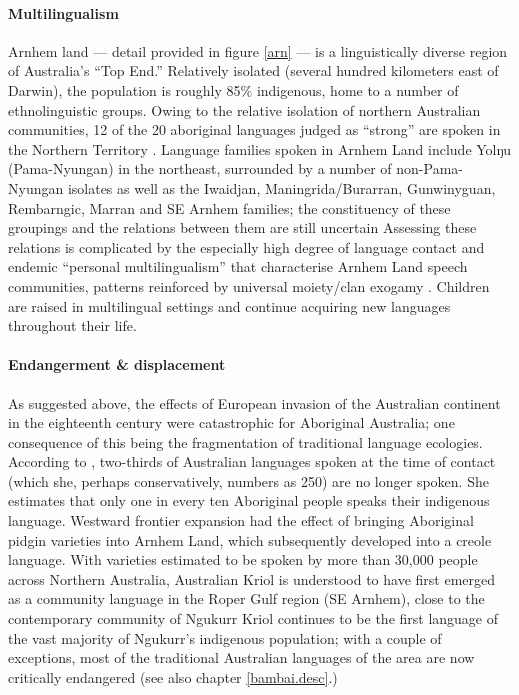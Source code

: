 \documentclass[11pt,dvipsnames]{report}
\begin{document}
\paragraph*{Multilingualism}

Arnhem land --- detail provided in figure \ref{arn} --- is a linguistically diverse region of Australia's ``Top End.'' Relatively isolated (several hundred kilometers east of Darwin), the population is roughly 85\% indigenous, home to a number of ethnolinguistic groups. Owing to the relative isolation of northern Australian communities, 12 of the 20 aboriginal languages judged as ``strong'' are spoken in the Northern Territory \citep[3]{Schmidt1990}. Language families spoken in Arnhem Land include Yolŋu (Pama-Nyungan) in the northeast, surrounded by a number of non-Pama-Nyungan isolates as well as the Iwaidjan, Maningrida/Burarran, Gunwinyguan, Rembarngic, Marran and SE Arnhem families; the constituency of these groupings and the relations between them are still uncertain \citetext{see \textit{e.g.}, \citealp{Green2003} for the proto-Arnhem proposal.} Assessing these relations is complicated by the especially high degree of language contact and endemic ``personal multilingualism'' that characterise Arnhem Land speech communities, patterns reinforced by universal moiety/clan exogamy \citetext{\citealp{McConvell2011,Evans2001}, see also \citealp[Ch. 1]{Williams1986,Wilkinson1991} for a discussion of clan exogamy in Yolŋu society}. Children are raised in multilingual settings and continue acquiring new languages throughout their life. 

\paragraph*{Endangerment \& displacement}

As suggested above, the effects of European invasion of the Australian continent in the eighteenth century were catastrophic for Aboriginal Australia; one consequence of this being the fragmentation of traditional language ecologies. According to \citet[1]{Schmidt1990}, two-thirds of Australian languages spoken at the time of contact (which she, perhaps conservatively, numbers as 250) are no longer spoken. She estimates that only one in every ten Aboriginal people speaks their indigenous language. Westward frontier expansion had the effect of bringing Aboriginal pidgin varieties into Arnhem Land, which subsequently developed into a creole language. With varieties estimated to be spoken by more than 30,000 people across Northern Australia, Australian Kriol is understood to have first emerged as a community language in the Roper Gulf region (SE Arnhem), close to the contemporary community of Ngukurr \citetext{\textit{e.g.}, \citealp{Harris1986a}, see also \citealp{Phillips2011} for an overview.} Kriol continues to be the first language of the vast majority of Ngukurr's indigenous population; with a couple of exceptions, most of the traditional Australian languages of the area are now critically endangered (see also chapter \ref{bambai.desc}.)
\end{document}
